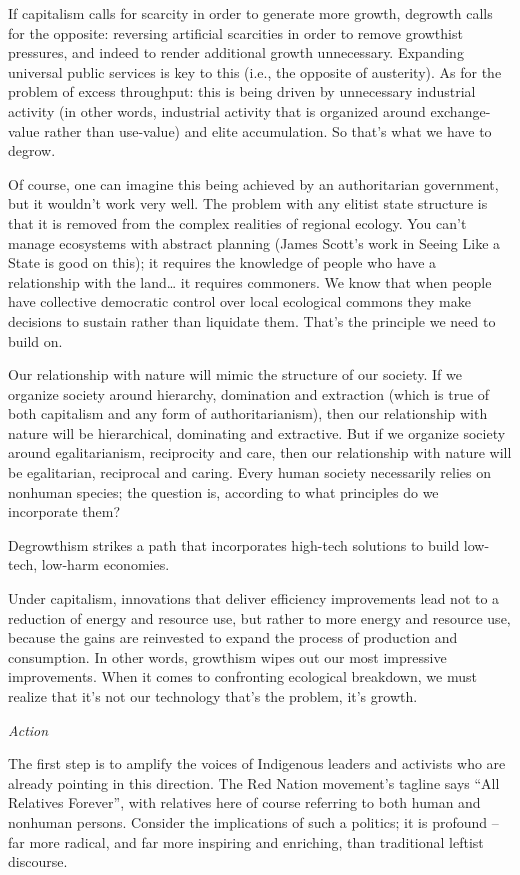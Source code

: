 \documentclass[
]{book}
\begin{document}
If capitalism calls for scarcity in order to generate more growth, degrowth calls for the opposite: reversing artificial scarcities in order to remove growthist pressures, and indeed to render additional growth unnecessary. Expanding universal public services is key to this (i.e., the opposite of austerity). As for the problem of excess throughput: this is being driven by unnecessary industrial activity (in other words, industrial activity that is organized around exchange-value rather than use-value) and elite accumulation. So that's what we have to degrow.

Of course, one can imagine this being achieved by an authoritarian government, but it wouldn't work very well. The problem with any elitist state structure is that it is removed from the complex realities of regional ecology. You can't manage ecosystems with abstract planning (James Scott's work in Seeing Like a State is good on this); it requires the knowledge of people who have a relationship with the land\ldots{} it requires commoners. We know that when people have collective democratic control over local ecological commons they make decisions to sustain rather than liquidate them. That's the principle we need to build on.

Our relationship with nature will mimic the structure of our society. If we organize society around hierarchy, domination and extraction (which is true of both capitalism and any form of authoritarianism), then our relationship with nature will be hierarchical, dominating and extractive. But if we organize society around egalitarianism, reciprocity and care, then our relationship with nature will be egalitarian, reciprocal and caring. Every human society necessarily relies on nonhuman species; the question is, according to what principles do we incorporate them?

Degrowthism strikes a path that incorporates high-tech solutions
to build low-tech, low-harm economies.

Under capitalism, innovations that deliver efficiency improvements lead not to a reduction of energy and resource use, but rather to more energy and resource use, because the gains are reinvested to expand the process of production and consumption. In other words, growthism wipes out our most impressive improvements. When it comes to confronting ecological breakdown, we must realize that it's not our technology that's the problem, it's growth.

\emph{Action}

The first step is to amplify the voices of Indigenous leaders and activists who are already pointing in this direction. The Red Nation movement's tagline says ``All Relatives Forever'', with relatives here of course referring to both human and nonhuman persons. Consider the implications of such a politics; it is profound -- far more radical, and far more inspiring and enriching, than traditional leftist discourse.
\end{document}
